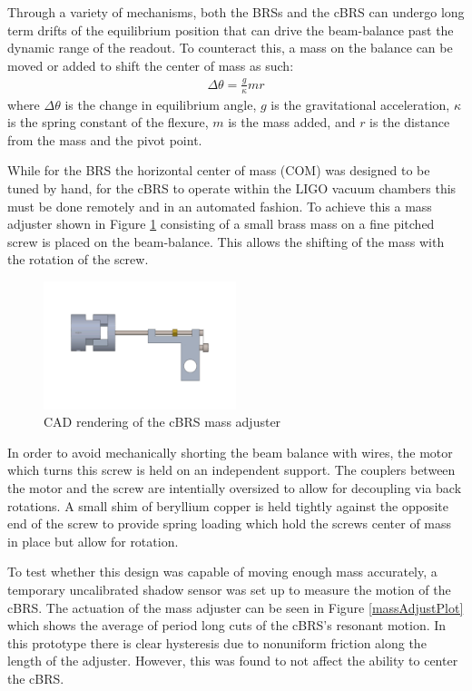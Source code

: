 \documentclass [12pt, proquest]{uwthesis}[2019]
\begin{document}
Through a variety of mechanisms, both the BRSs and the cBRS can undergo long term drifts of the equilibrium position that can drive the beam-balance past the dynamic range of the readout. To counteract this, a mass on the balance can be moved or added to shift the center of mass as such:
\begin{align}
\Delta \theta=\frac{g}{\kappa} m r
\end{align}
where $\Delta \theta$ is the change in equilibrium angle, $g$ is the gravitational acceleration, $\kappa$ is the spring constant of the flexure, $m$ is the mass added, and $r$ is the distance from the mass and the pivot point.

While for the BRS the horizontal center of mass (COM) was designed to be tuned by hand, for the cBRS to operate within the LIGO vacuum chambers this must be done remotely and in an automated fashion. To achieve this a mass adjuster shown in Figure \ref{massAdjust} consisting of a small brass mass on a fine pitched screw is placed on the beam-balance. This allows the shifting of the mass with the rotation of the screw. 

\begin{figure}[!h]
\begin{center}
\includegraphics[width=0.5\textwidth]{cBRSMassAdjuster.png}
\end{center}
\caption[CAD rendering of the cBRS mass adjuster]{CAD rendering of the cBRS mass adjuster}\label{massAdjust}
\end{figure}


In order to avoid mechanically shorting the beam balance with wires, the motor which turns this screw is held on an independent support. The couplers between the motor and the screw are intentially oversized to allow for decoupling via back rotations. A small shim of beryllium copper is held tightly against the opposite end of the screw to provide spring loading which hold the screws center of mass in place but allow for rotation.

To test whether this design was capable of moving enough mass accurately, a temporary uncalibrated shadow sensor was set up to measure the motion of the cBRS. The actuation of the mass adjuster can be seen in Figure \ref{massAdjustPlot} which shows the average of period long cuts of the cBRS's resonant motion. In this prototype there is clear hysteresis due to nonuniform friction along the length of the adjuster. However, this was found to not affect the ability to center the cBRS. 
\end{document}
